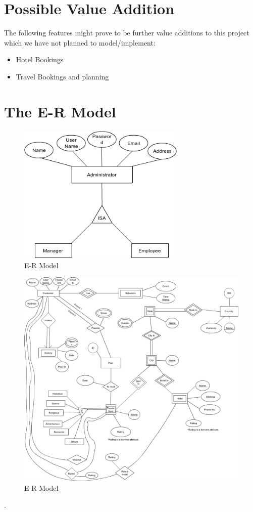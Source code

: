 \documentclass[11pt]{article}
\begin{document}
\section{Possible Value Addition}
The following features might prove to be further value additions to this project which we have not planned to model/implement:
\begin{itemize}
\item Hotel Bookings
\item Travel Bookings and planning
\end{itemize}

\section{The E-R Model}
\begin{figure}[ht!]
\centering
\includegraphics[width=80mm]{admin.png}
\caption{E-R Model}
\label{overflow}
\end{figure}

\begin{figure}[ht!]
\centering
\includegraphics[width=200mm]{er.png}
\caption{E-R Model}
\label{overflow}
\end{figure}
.
\newline
\newline
\newline
\newline
\end{document}
